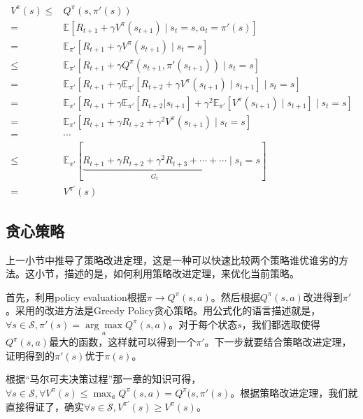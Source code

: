 \documentclass[a4paper]{article}
\begin{document}
\begin{equation}
    \begin{aligned}
        V^\pi(s) \leq & Q^\pi(s,\pi'(s)) \\
        = & \mathbb{E}\left[R_{t+1}+\gamma V^{
        \pi}\left(s_{t+1}\right) \mid s_{t}=s,a_t =\pi'(s)\right] \\
        = & \mathbb{E}_{\pi'}\left[R_{t+1}+\gamma V^{
        \pi}\left(s_{t+1}\right) \mid s_{t}=s\right] \\
        \leq & \mathbb{E}_{\pi'}\left[R_{t+1}+\gamma Q^\pi(s_{t+1},\pi'(s_{t+1})) \mid s_{t}=s\right] \\
        = & \mathbb{E}_{\pi'}\left[R_{t+1}+\gamma \mathbb{E}_{\pi'}\left[ R_{t+2} + \gamma V^\pi(s_{t+1}) \mid s_{t+1} \right] \mid s_{t}=s\right] \\
        = & \mathbb{E}_{\pi'}\left[R_{t+1}+\gamma \mathbb{E}_{\pi'}\left[ R_{t+2}|s_{t+1} \right] + \gamma^2 \mathbb{E}_{\pi'}\left[ V^\pi(s_{t+1}) \mid s_{t+1} \right] \mid s_{t}=s\right] \\
        = & \mathbb{E}_{\pi'}\left[R_{t+1}+\gamma R_{t+2} + \gamma^2  V^\pi(s_{t+1}) \mid s_{t}=s\right] \\
        = & \cdots \\
        \leq & \mathbb{E}_{\pi'}[\underbrace{R_{t+1}+\gamma R_{t+2} + \gamma^2 R_{t+3} + \cdots + \cdots}_{G_t} \mid s_{t}=s] \\
        = & V^{\pi'}(s)
        \end{aligned}
\end{equation}

\subsection{贪心策略}
上一小节中推导了策略改进定理，这是一种可以快速比较两个策略谁优谁劣的方法。这小节，描述的是，如何利用策略改进定理，来优化当前策略。

首先，利用policy evaluation根据$\pi\to Q^\pi(s,a)$。然后根据$Q^\pi(s,a)$改进得到$\pi'$。采用的改进方法是Greedy Policy贪心策略。用公式化的语言描述就是，$\forall s\in \mathcal{S},\pi'(s) = \underset{a}{\arg\max} Q^\pi(s,a)$。对于每个状态$s$，我们都选取使得$Q^\pi(s,a)$最大的函数，这样就可以得到一个$\pi'$。下一步就要结合策略改进定理，证明得到的$\pi'(s)$优于$\pi(s)$。

根据“马尔可夫决策过程”那一章的知识可得，$\forall s \in \mathcal{S},\forall V^\pi(s) \leq \max_a Q^\pi(s,a) = Q^\pi(s,\pi'(s)$。根据策略改进定理，我们就直接得证了，确实$\forall s\in \mathcal{S},V^{\pi'}(s) \geq V^\pi(s)$。
\end{document}
